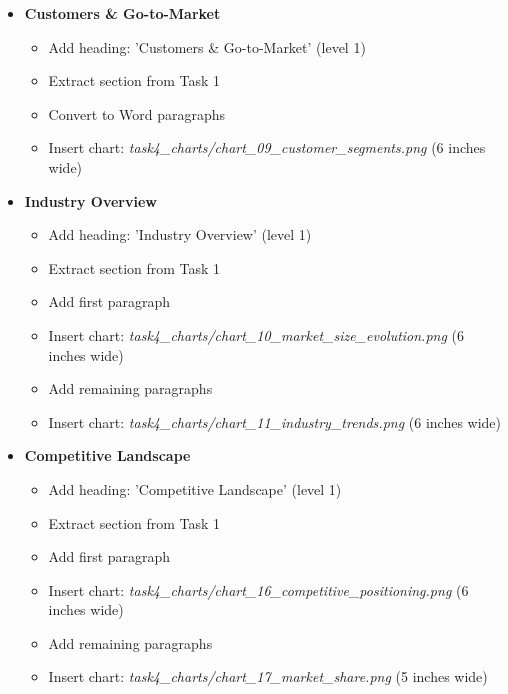 \documentclass[11pt]{article}
\begin{document}
\begin{itemize}[leftmargin=*,itemsep=2pt,topsep=2pt]
\begin{itemize}[leftmargin=*,itemsep=2pt,topsep=2pt]
\item {} Add remaining paragraphs
\end{itemize}
\item {} \textbf{Customers \& Go-to-Market}
\begin{itemize}[leftmargin=*,itemsep=2pt,topsep=2pt]
\item {} Add heading: 'Customers \& Go-to-Market' (level 1)
\item {} Extract section from Task 1
\item {} Convert to Word paragraphs
\item {} Insert chart: \emph{task4\_\allowbreak{}charts/chart\_\allowbreak{}09\_\allowbreak{}customer\_\allowbreak{}segments.png} (6 inches wide)
\end{itemize}
\item {} \textbf{Industry Overview}
\begin{itemize}[leftmargin=*,itemsep=2pt,topsep=2pt]
\item {} Add heading: 'Industry Overview' (level 1)
\item {} Extract section from Task 1
\item {} Add first paragraph
\item {} Insert chart: \emph{task4\_\allowbreak{}charts/chart\_\allowbreak{}10\_\allowbreak{}market\_\allowbreak{}size\_\allowbreak{}evolution.png} (6 inches wide)
\item {} Add remaining paragraphs
\item {} Insert chart: \emph{task4\_\allowbreak{}charts/chart\_\allowbreak{}11\_\allowbreak{}industry\_\allowbreak{}trends.png} (6 inches wide)
\end{itemize}
\item {} \textbf{Competitive Landscape}
\begin{itemize}[leftmargin=*,itemsep=2pt,topsep=2pt]
\item {} Add heading: 'Competitive Landscape' (level 1)
\item {} Extract section from Task 1
\item {} Add first paragraph
\item {} Insert chart: \emph{task4\_\allowbreak{}charts/chart\_\allowbreak{}16\_\allowbreak{}competitive\_\allowbreak{}positioning.png} (6 inches wide)
\item {} Add remaining paragraphs
\item {} Insert chart: \emph{task4\_\allowbreak{}charts/chart\_\allowbreak{}17\_\allowbreak{}market\_\allowbreak{}share.png} (5 inches wide)
\end{itemize}

\end{itemize}
\end{document}
